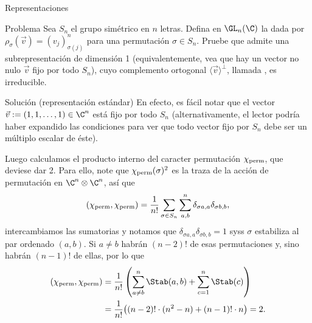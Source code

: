 \documentclass[10pt]{beamer}
\begin{document}
\begin{frame}{Representaciones}
	\begin{block}{Problema}
		Sea $S_n$ el grupo simétrico en $n$ letras.
		Defina en $\GL_n(\C)$ la  dada por $\rho_\sigma(\vec v) =
		(v_j)_{\sigma(j)}^n$ para una permutación $\sigma \in S_n$.
		\pause
		Pruebe que admite una subrepresentación de dimensión 1 (equivalentemente, vea que hay un vector no nulo
		$\vec v$ fijo por todo $S_n$), cuyo complemento ortogonal $\langle \vec v \rangle^\perp$, llamada
		, es irreducible.
	\end{block}
\end{frame}
\begin{frame}{Solución (representación estándar)}
	\small
	En efecto, es fácil notar que el vector $\vec v := (1, 1, \dots, 1) \in \C^n$ está fijo por todo $S_n$
	\pause
	(alternativamente, el lector podría haber expandido las condiciones para ver que todo vector fijo por $S_n$ debe
	ser un múltiplo escalar de éste).

	\pause
	Luego calculamos el producto interno del caracter permutación $\chi_{\rm perm}$, que deviese dar 2.
	Para ello, note que $\chi_{\rm perm}(\sigma)^2$ es la traza de la acción de permutación en $\C^n \otimes \C^n$,
	así que
	\pause
	\[
		(\chi_{\rm perm}, \chi_{\rm perm}) = \frac{1}{n!} \sum_{\sigma\in S_n} \sum_{a, b}^{n} \delta_{\sigma a,
		a} \delta_{\sigma b, b},
	\]
	\pause
	intercambiamos las sumatorias y notamos que $\delta_{\sigma a, a} \delta_{\sigma b, b} = 1$ syss $\sigma$
	estabiliza al par ordenado $(a, b)$.
	\pause
	Si $a \ne b$ habrán $(n-2)!$ de esas permutaciones y, sino habrán $(n-1)!$ de ellas, por lo que
	\pause
	\begin{align*}
		(\chi_{\rm perm}, \chi_{\rm perm})
		&= \frac{1}{n!} \left( \sum_{a\ne b}^{n} \Stab(a, b) + \sum_{c=1}^{n} \Stab(c) \right) \\
		&= \frac{1}{n!} \big( (n-2)!\cdot(n^2 - n) + (n-1)!\cdot n \big) = 2.
	\end{align*}
\end{frame}
\end{document}

